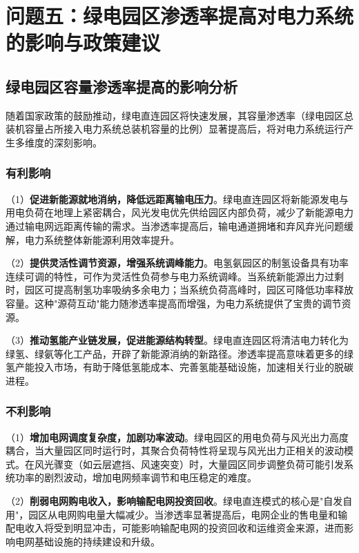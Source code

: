 \section{问题五：绿电园区渗透率提高对电力系统的影响与政策建议}

\subsection{绿电园区容量渗透率提高的影响分析}

随着国家政策的鼓励推动，绿电直连园区将快速发展\cite{ref1}，其容量渗透率（绿电园区总装机容量占所接入电力系统总装机容量的比例）显著提高后，将对电力系统运行产生多维度的深刻影响。

\subsubsection{有利影响}

（1）\textbf{促进新能源就地消纳，降低远距离输电压力}。绿电直连园区将新能源发电与用电负荷在地理上紧密耦合，风光发电优先供给园区内部负荷，减少了新能源电力通过输电网远距离传输的需求。当渗透率提高后，输电通道拥堵和弃风弃光问题缓解，电力系统整体新能源利用效率提升。

（2）\textbf{提供灵活性调节资源，增强系统调峰能力}。电氢氨园区的制氢设备具有功率连续可调的特性，可作为灵活性负荷参与电力系统调峰。当系统新能源出力过剩时，园区可提高制氢功率吸纳多余电力；当系统负荷高峰时，园区可降低功率释放容量。这种"源荷互动"能力随渗透率提高而增强，为电力系统提供了宝贵的调节资源。

（3）\textbf{推动氢能产业链发展，促进能源结构转型}。绿电直连园区将清洁电力转化为绿氢、绿氨等化工产品，开辟了新能源消纳的新路径。渗透率提高意味着更多的绿氢产能投入市场，有助于降低氢能成本、完善氢能基础设施，加速相关行业的脱碳进程。

\subsubsection{不利影响}

（1）\textbf{增加电网调度复杂度，加剧功率波动}。绿电园区的用电负荷与风光出力高度耦合，当大量园区同时运行时，其聚合负荷特性将呈现与风光出力正相关的波动模式。在风光骤变（如云层遮挡、风速突变）时，大量园区同步调整负荷可能引发系统功率的剧烈波动，增加电网频率调节和电压稳定的难度。

（2）\textbf{削弱电网购电收入，影响输配电网投资回收}。绿电直连模式的核心是"自发自用"，园区从电网购电量大幅减少。当渗透率显著提高后，电网企业的售电量和输配电收入将受到明显冲击，可能影响输配电网的投资回收和运维资金来源，进而影响电网基础设施的持续建设和升级。

